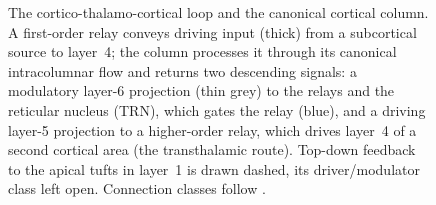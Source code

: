 \begin{figure}[htbp]
\caption[The cortico-thalamo-cortical loop]{%
  The cortico-thalamo-cortical loop and the canonical cortical column.
  A first-order relay conveys driving input (thick) from a subcortical
  source to layer~4; the column processes it through its canonical
  intracolumnar flow and returns two descending signals: a modulatory
  layer-6 projection (thin grey) to the relays and the reticular nucleus
  (TRN), which gates the relay (blue), and a driving layer-5 projection
  to a higher-order relay, which drives layer~4 of a second cortical area
  (the transthalamic route). Top-down feedback to the apical tufts in
  layer~1 is drawn dashed, its driver/modulator class left open.
  Connection classes follow \textcite{sherman1998, sherman2013}.}
\label{fig:bio-loop}
\end{figure}